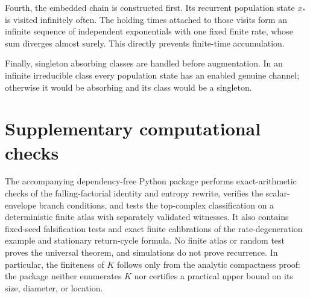 Fourth, the embedded chain is constructed first.  Its recurrent population
state \(x_*\) is visited infinitely often.  The holding times attached to
those visits form
an infinite sequence of independent exponentials with one fixed finite rate,
whose sum diverges almost surely.  This directly prevents finite-time
accumulation.

Finally, singleton absorbing classes are handled before augmentation.  In an
infinite irreducible class every population state has an enabled genuine
channel; otherwise it would be absorbing and its class would be a singleton.

\section{Supplementary computational checks}\label{app:verification}

The accompanying dependency-free Python package performs exact-arithmetic
checks of the falling-factorial identity and entropy rewrite, verifies the
scalar-envelope branch conditions, and tests the top-complex classification
on a deterministic finite atlas with separately validated witnesses.  It also
contains fixed-seed falsification tests and exact finite calibrations of the
rate-degeneration example and stationary return-cycle formula.  No finite
atlas or random test proves the universal theorem, and simulations do not
prove recurrence.  In particular, the finiteness of \(K\) follows only from
the analytic compactness proof: the package neither enumerates \(K\) nor
certifies a practical upper bound on its size, diameter, or location.



